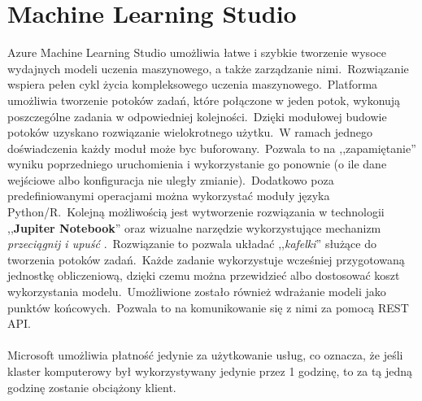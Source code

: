 \section{Machine Learning Studio}
Azure Machine Learning Studio umożliwia łatwe i szybkie tworzenie wysoce wydajnych modeli uczenia maszynowego, a także zarządzanie nimi.\ Rozwiązanie wspiera pełen cykl życia kompleksowego uczenia maszynowego.\ Platforma umożliwia tworzenie potoków zadań, które połączone w jeden potok, wykonują poszczególne zadania w odpowiedniej kolejności.\ Dzięki modułowej budowie potoków uzyskano rozwiązanie wielokrotnego użytku.\ W ramach jednego doświadczenia każdy moduł może byc buforowany.\ Pozwala to na ,,zapamiętanie'' wyniku poprzedniego uruchomienia i wykorzystanie go ponownie (o ile dane wejściowe albo konfiguracja nie uległy zmianie).\ Dodatkowo poza predefiniowanymi operacjami można wykorzystać moduły języka Python/R.\ Kolejną możliwością jest wytworzenie rozwiązania w technologii ,,\textbf{Jupiter Notebook}'' oraz wizualne narzędzie wykorzystujące mechanizm \textit{przeciągnij i upuść} .\ Rozwiązanie to pozwala układać ,,\textit{kafelki}'' służące do tworzenia potoków zadań.\ Każde zadanie wykorzystuje wcześniej przygotowaną jednostkę obliczeniową, dzięki czemu można przewidzieć albo dostosować koszt wykorzystania modelu.\ Umożliwione zostało również wdrażanie modeli jako punktów końcowych.\ Pozwala to na komunikowanie się z nimi za pomocą REST API.\\ \\

Microsoft umożliwia płatność jedynie za użytkowanie usług, co oznacza, że jeśli klaster komputerowy był wykorzystywany jedynie przez 1 godzinę, to za tą jedną godzinę zostanie obciążony klient\cite{MicrosoftAzuref}.
